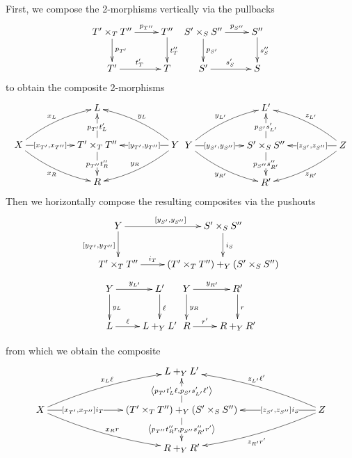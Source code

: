 \documentclass[12pt]{article}
\renewcommand{\(}{\left(}
\renewcommand{\)}{\right)}
\renewcommand{\{}{\left\lbrace}
\renewcommand{\}}{\right\rbrace}
\theoremstyle{remark}
\theoremstyle{definition}
\begin{document}
First, we compose the 2-morphisms vertically via the pullbacks
\begin{equation} \label{Diag:VH_VertCompPullbacks}
\xymatrix{
	T' \times_T T'' 
	\ar[r]^-{p_{T''}}
	\ar[d]^-{p_{T'}}   &
	T'' \ar[d]^{t''_T}  \\
	T' 
	\ar[r]^{t'_T} &
	T \\
}
%
\xymatrix{
	S' \times_S S'' 
	\ar[r]^-{p_{S''}} 
	\ar[d]^{p_{S'}}   &
	S'' 
	\ar[d]^{s''_S}  \\
	S' 
	\ar[r]^{s'_S} &
	S
}
\end{equation}
to obtain the composite 2-morphisms
\begin{equation} \label{Diag:VH-VertCompResult}
\xymatrix@C=1.75cm{
	{} &
	L &
	{} \\
	X 
	\ar@/^/[ru]^{x_L}
	\ar[r]|-{ \left[ x_{T'},x_{T''} \right] }
	\ar@/_/[rd]_{x_R} &
	T' \times_T T''
	\ar[u]|{ p_{T'}t'_{L} }
	\ar[d]|{ p_{T''}t''_{R} } &
	Y 
	\ar@/_/[lu]_{ y_L }
	\ar[l]|-{ \left[ y_{T'},y_{T''} \right] }
	\ar@/^/[ld]_{y_R} \\
	{} &
	R &
}
\xymatrix@C=1.75cm{
	{} &
	L' &
	{} \\
	Y 
	\ar@/^/[ru]^{y_{L'}}
	\ar[r]|-{\left[ y_{S'},y_{S''} \right]}
	\ar@/_/[rd]_{y_{R'}} &
	S' \times_S S''
	\ar[u]|{p_{S'}s'_{L'}}
	\ar[d]|{p_{S''}s''_{R'}} &
	Z 
	\ar@/_/[lu]_{z_{L'}}
	\ar[l]|-{\left[ z_{S'},z_{S''} \right]}
	\ar@/^/[ld]^{z_{R'}} \\
	{} &
	R' &
	{} 
}
\end{equation}
Then we horizontally compose the resulting composites  via the pushouts
\begin{equation} \label{Diag:VH_HorCompPushouts_1}
\xymatrix{
	Y 
	\ar[r]^{\left[y_{S'}, y_{S''} \right]}
	\ar[d]_{\left[y_{T'}, y_{T''} \right]}   &
	S' \times_S S''
	\ar[d]^{i_{S}}  \\
	T' \times_T T''
	\ar[r]^-{i_T}  &
	(T' \times_T T'') +_Y (S' \times_S S'')
}
\end{equation}
\begin{equation} \label{Diag:VH_HowCompPushouts_2}
\xymatrix{
	Y 
	\ar[r]^{y_{L'}} 
	\ar[d]^{y_{L}} &
	L' 
	\ar[d]^{\ell} \\
	L 
	\ar[r]^-{\ell} &
	L +_Y L'
}
%
\xymatrix{
	Y 
	\ar[r]^{y_{R'}}
	\ar[d]^{y_{R}} &
	R' 
	\ar[d]^{r} \\
	R 
	\ar[r]^-{r'} &
	R +_Y R'
}
\end{equation}

from which we obtain the composite
\begin{equation} \label{Diag:VH_FinalComposite}
	\xymatrix@C=1.25cm{
		{} &
		{} &
		L +_Y L' &
		{} &
		{} \\
		X 
			\ar@/^/[rru]^{x_L \ell} 
			\ar[rr]|(.3){\left[x_{T'},x_{T''} \right] i_T}
			\ar@/_/[rrd]^{x_R r} &  
		{} &
		(T' \times_T T'') +_Y (S' \times_S S'') 
			\ar[u]|{\left\langle  p_{T'}t'_{L}\ell,p_{S'}s'_{L'}\ell' \right\rangle} 
			\ar[d]|{\left\langle  p_{T''}t''_{R}r,p_{S''}s''_{R'}r' \right\rangle} &
		{} &
		Z 
			\ar@/_/[llu]_{z_{L'}\ell'}
			\ar[ll]|(.3){\left[z_{S'},z_{S''} \right] i_S}
			\ar@/^/[lld]^{z_{R'}r'} \\
		{} &
		{} &
		R +_Y R' &
		{} &
		{}
}
\end{equation}
\end{document}
